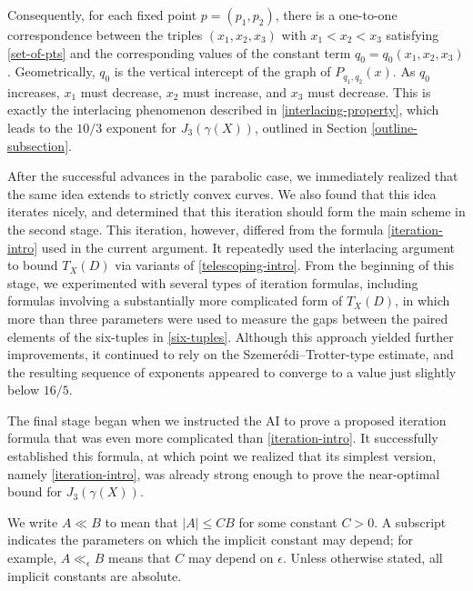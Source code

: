 \documentclass{amsart}
\numberwithin{equation}{section}
\begin{document}
Consequently, for each fixed point $p=(p_1,p_2)$, there is a one-to-one correspondence between the triples $(x_1,x_2,x_3)$ with $x_1<x_2<x_3$ satisfying \eqref{set-of-pts} and the corresponding values of the constant term $q_0=q_0(x_1,x_2,x_3)$.
Geometrically, $q_0$ is the vertical intercept of the graph of $P_{q_1,q_2}(x)$. 
As $q_0$ increases, $x_1$ must decrease, $x_2$ must increase, and $x_3$ must decrease. 
This is exactly the interlacing phenomenon described in \eqref{interlacing-property}, which leads to the $10/3$ exponent for $J_3(\gamma(X))$, outlined in Section \ref{outline-subsection}.



After the successful advances in the parabolic case, we immediately realized that the same idea extends to strictly convex curves. We also found that this idea iterates nicely, and determined that this iteration should form the main scheme in the second stage.
This iteration, however, differed from the formula \eqref{iteration-intro} used in the current argument.
It repeatedly used the interlacing argument to bound $T_X(D)$ via variants of  \eqref{telescoping-intro}.
From the beginning of this stage, we experimented with several types of iteration formulas, including formulas involving a substantially more complicated form of $T_X(D)$, in which more than three parameters were used to measure the gaps between the paired elements of the six-tuples in \eqref{six-tuples}.
Although this approach yielded further improvements, it continued to rely on the Szemer\'edi--Trotter-type estimate, and the resulting sequence of exponents appeared to converge to a value just slightly below $16/5$.


The final stage began when we instructed the AI to prove a proposed iteration formula that was even more complicated than \eqref{iteration-intro}.
It successfully established this formula, at which point we realized that its simplest version, namely \eqref{iteration-intro}, was already strong enough to prove the near-optimal bound for $J_3(\gamma(X))$.



\bigskip

We write $A\ll B$ to mean that $|A|\leq C B$ for some constant $C>0$. 
A subscript indicates the parameters on which the implicit constant may depend; for example, $A\ll_{\epsilon} B$ means that $C$ may depend on $\epsilon$.
Unless otherwise stated, all implicit constants are absolute.

\bigskip
\end{document}
